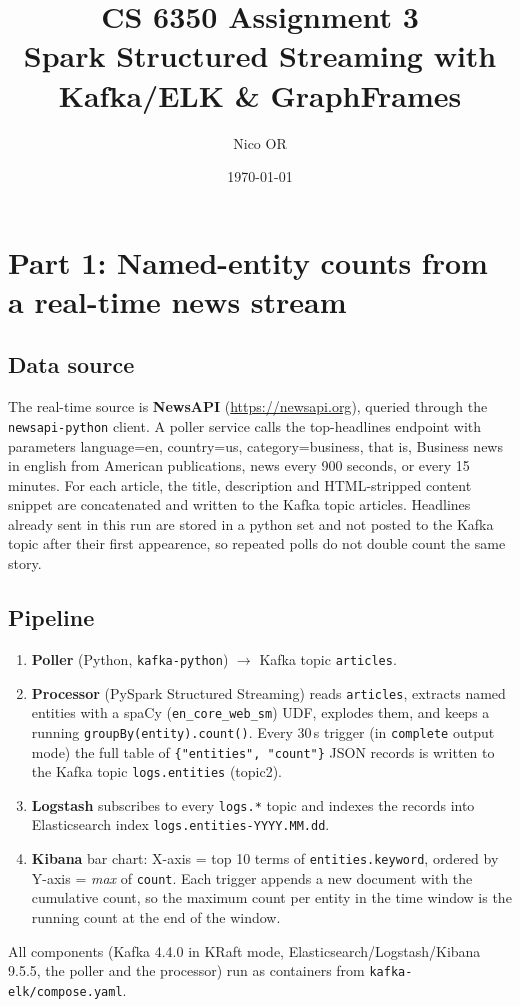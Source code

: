 \documentclass[11pt]{article}
\title{CS 6350 Assignment 3\\\large Spark Structured Streaming with
Kafka/ELK \& GraphFrames}
\author{Nico OR}
\date{\today}
\begin{document}
\maketitle

\section{Part 1: Named-entity counts from a real-time news stream}

\subsection{Data source}
The real-time source is \textbf{NewsAPI} (\url{https://newsapi.org}), queried
through the \texttt{newsapi-python} client. A poller service calls the
top-headlines endpoint with parameters language=en, country=us,
category=business, that is,  Business news in english from American
publications, news every 900 seconds, or every 15 minutes. For each
article, the title, description and HTML-stripped content snippet are
concatenated and written to the Kafka topic articles. Headlines
already sent in this run are stored in a python set and not posted to
the Kafka topic after their first appearence, so repeated polls do
not double count the same story.

\subsection{Pipeline}
\begin{enumerate}
  \item \textbf{Poller} (Python, \texttt{kafka-python}) $\rightarrow$
    Kafka topic \texttt{articles}.
  \item \textbf{Processor} (PySpark Structured Streaming) reads
    \texttt{articles},
    extracts named entities with a spaCy (\texttt{en\_core\_web\_sm}) UDF,
    explodes them, and keeps a running \texttt{groupBy(entity).count()}.
    Every 30\,s trigger (in \texttt{complete} output mode) the full table of
    \texttt{\{"entities", "count"\}} JSON records is written to the Kafka topic
    \texttt{logs.entities} (topic2).
  \item \textbf{Logstash} subscribes to every \texttt{logs.*} topic
    and indexes the
    records into Elasticsearch index \texttt{logs.entities-YYYY.MM.dd}.
  \item \textbf{Kibana} bar chart: X-axis = top 10 terms of
    \texttt{entities.keyword}, ordered by Y-axis = \emph{max} of \texttt{count}.
    Each trigger appends a new document with the cumulative count, so the
    maximum count per entity in the time window is the running count at the
    end of the window.
\end{enumerate}
All components (Kafka 4.4.0 in KRaft mode, Elasticsearch/Logstash/Kibana 9.5.5,
the poller and the processor) run as containers from
\texttt{kafka-elk/compose.yaml}.
\end{document}
